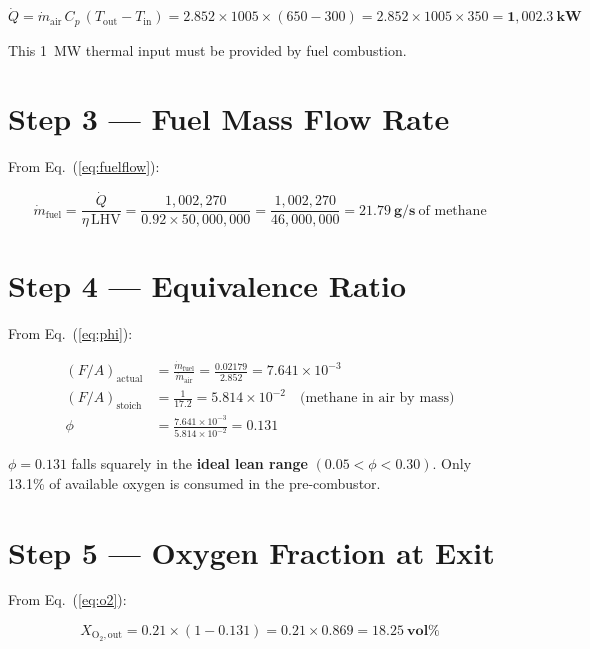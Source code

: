\documentclass[12pt,a4paper]{report}
\begin{document}
\begin{equation}
  \dot{Q}
  = \dot{m}_\text{air}\,C_p\,(T_\text{out}-T_\text{in})
  = 2.852 \times 1005 \times (650-300)
  = 2.852 \times 1005 \times 350
  = \mathbf{1{,}002.3\ \text{kW}}
\end{equation}

\noindent This 1~MW thermal input must be provided by fuel combustion.

\section{Step 3 — Fuel Mass Flow Rate}

From Eq.~(\ref{eq:fuelflow}):

\begin{equation}
  \dot{m}_\text{fuel}
  = \frac{\dot{Q}}{\eta\,\text{LHV}}
  = \frac{1{,}002{,}270}{0.92 \times 50{,}000{,}000}
  = \frac{1{,}002{,}270}{46{,}000{,}000}
  = \mathbf{21.79\ \text{g/s}}\ \text{of methane}
\end{equation}

\section{Step 4 — Equivalence Ratio}

From Eq.~(\ref{eq:phi}):

\begin{align}
  (F/A)_\text{actual}
  &= \frac{\dot{m}_\text{fuel}}{\dot{m}_\text{air}}
  = \frac{0.02179}{2.852} = 7.641\times10^{-3}\\[6pt]
  (F/A)_\text{stoich}
  &= \frac{1}{17.2} = 5.814\times10^{-2}
  \quad\text{(methane in air by mass)}\\[6pt]
  \phi &= \frac{7.641\times10^{-3}}{5.814\times10^{-2}}
  = \mathbf{0.131}
\end{align}

\begin{resultbox}
$\phi = 0.131$ falls squarely in the \textbf{ideal lean range}
$(0.05 < \phi < 0.30)$.
Only 13.1\% of available oxygen is consumed in the pre-combustor.
\end{resultbox}

\section{Step 5 — Oxygen Fraction at Exit}

From Eq.~(\ref{eq:o2}):

\begin{equation}
  X_{\text{O}_2,\text{out}}
  = 0.21 \times (1 - 0.131)
  = 0.21 \times 0.869
  = \mathbf{18.25\ \text{vol\%}}
\end{equation}
\end{document}

